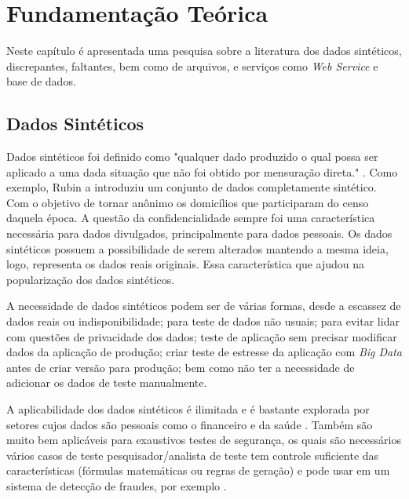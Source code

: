 \documentclass[
	12pt,				%
	openright,			%
	oneside,			%
	a4paper,			%
	english,			%
	brazil				%
	]{abntex2}
\begin{document}
\chapter{Fundamentação Teórica}
	Neste capítulo é apresentada uma pesquisa sobre a literatura dos dados sintéticos, discrepantes, faltantes,
	 bem como de arquivos, e serviços como \emph{Web Service} e base de dados.


	\section{Dados Sintéticos}
		Dados sintéticos foi definido como "qualquer dado produzido o qual possa ser aplicado a uma dada situação que não foi obtido por mensuração direta." \cite{mcgraw-hilleducation2016}.
		Como exemplo, Rubin \cite{rubin1993statistical} a introduziu um conjunto de dados completamente sintético.
		Com o objetivo de tornar anônimo os domicílios que participaram do censo daquela época.
		A questão da confidencialidade sempre foi uma característica necessária para dados divulgados, principalmente para dados pessoais.
		Os dados sintéticos possuem a possibilidade de serem alterados mantendo a mesma ideia, logo, representa os dados reais originais.
		Essa característica que ajudou na popularização dos dados sintéticos.
		\par
		A necessidade de dados sintéticos podem ser de várias formas, 
		desde a escassez de dados reais ou indisponibilidade;
		para teste de dados não usuais;
		para evitar lidar com questões de privacidade dos dados;
		teste de aplicação sem precisar modificar dados da aplicação de produção;
		criar teste de estresse da aplicação com \emph{Big Data} antes de criar versão para produção;
		bem como não ter a necessidade de adicionar os dados de teste manualmente. \cite{top15DatagenTools2019}
		\par
		A aplicabilidade dos dados sintéticos é ilimitada e é bastante explorada por setores cujos dados são pessoais como o financeiro \cite{lopez2012money} e da saúde \cite{bergeat2014french}.	
		Também são muito bem aplicáveis para exaustivos testes de segurança, os quais são necessários vários casos de teste
		pesquisador/analista de teste tem controle suficiente das características (fórmulas matemáticas ou regras de geração) e pode usar em um sistema de detecção de fraudes, por exemplo \cite{barse2003synthesizing}.
		
\end{document}

